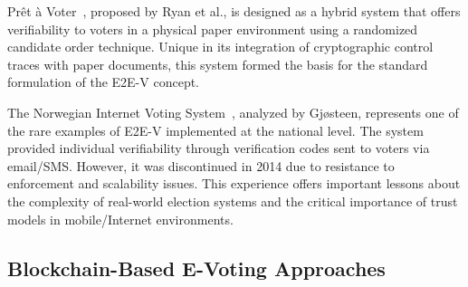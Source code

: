 \documentclass[a4paper,fleqn]{cas-sc}
\begin{document}

Pr\^{e}t \`{a} Voter~\cite{Ryan2009}, proposed by Ryan et al., is designed as a hybrid system that offers verifiability to voters in a physical paper environment using a randomized candidate order technique. Unique in its integration of cryptographic control traces with paper documents, this system formed the basis for the standard formulation of the E2E-V concept.


The Norwegian Internet Voting System~\cite{Gjosteen2010}, analyzed by Gj\o{}steen, represents one of the rare examples of E2E-V implemented at the national level. The system provided individual verifiability through verification codes sent to voters via email/SMS. However, it was discontinued in 2014 due to resistance to enforcement and scalability issues. This experience offers important lessons about the complexity of real-world election systems and the critical importance of trust models in mobile/Internet environments.

\subsection{Blockchain-Based E-Voting Approaches}
\end{document}
